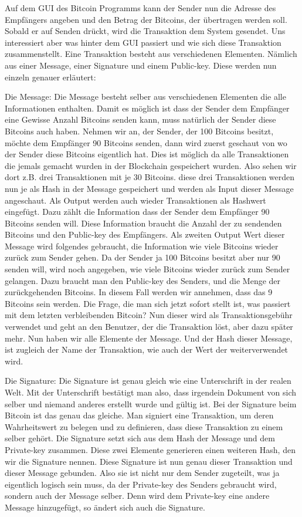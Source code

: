 \noindent
Auf dem GUI des Bitcoin Programms kann der Sender nun die Adresse des Empfängers angeben und den Betrag der Bitcoins, der übertragen werden soll.
Sobald er auf Senden drückt, wird die Transaktion dem System gesendet. Uns interessiert aber was hinter dem GUI passiert und wie sich diese Transaktion zusammenstellt.
Eine Transaktion besteht aus verschiedenen Elementen. Nämlich aus einer Message, einer Signature und einem Public-key. Diese werden nun einzeln genauer erläutert:

\noindent
Die Message:
Die Message besteht selber aus verschiedenen Elementen die alle Informationen enthalten. Damit es möglich ist dass der Sender dem Empfänger eine Gewisse Anzahl Bitcoins senden kann, muss natürlich
der Sender diese Bitcoins auch haben. Nehmen wir an, der Sender, der 100 Bitcoins besitzt, möchte dem Empfänger 90 Bitcoins senden, dann wird zuerst geschaut von wo der Sender diese Bitcoins eigentlich hat. Dies ist möglich da
alle Transaktionen die jemals gemacht wurden in der Blockchain gespeichert wurden. Also sehen wir dort z.B. drei Transaktionen mit je 30 Bitcoins. diese drei Transaktionen werden nun je als Hash in der
Message gespeichert und werden als Input dieser Message angeschaut. Als Output werden auch wieder Transaktionen als Hashwert eingefügt. Dazu zählt die Information dass der Sender dem Empfänger 90 Bitcoins senden
will. Diese Information braucht die Anzahl der zu sendenden Bitcoins und den Public-key des Empfängers. Als zweiten Output Wert dieser Message wird folgendes gebraucht, die Information wie viele Bitcoins wieder
zurück zum Sender gehen. Da der Sender ja 100 Bitcoins besitzt aber nur 90 senden will, wird noch angegeben, wie viele Bitcoins wieder zurück zum Sender gelangen. Dazu braucht man den Public-key des Senders,
und die Menge der zurückgehenden Bitcoins. In diesem Fall werden wir annehmen, dass das 9 Bitcoins sein werden. Die Frage, die man sich jetzt sofort stellt ist, was passiert mit dem letzten verbleibenden
Bitcoin? Nun dieser wird als Transaktionsgebühr verwendet und geht an den Benutzer, der die Transaktion löst, aber dazu später mehr. Nun haben wir alle Elemente der Message. Und der Hash dieser Message, ist
zugleich der Name der Transaktion, wie auch der Wert der weiterverwendet wird.

\noindent
Die Signature:
Die Signature ist genau gleich wie eine Unterschrift in der realen Welt. Mit der Unterschrift bestätigt man also, dass irgendein Dokument von sich selber und niemand anderes erstellt wurde und gültig ist.
Bei der Signature beim Bitcoin ist das genau das gleiche. Man signiert eine Transaktion, um deren Wahrheitswert zu belegen und zu definieren, dass diese Transaktion zu einem selber gehört. Die Signature
setzt sich aus dem Hash der Message und dem Private-key zusammen. Diese zwei Elemente generieren einen weiteren Hash, den wir die Signature nennen. Diese Signature ist nun genau dieser Transaktion
und dieser Message gebunden. Also sie ist nicht nur dem Sender zugeteilt, was ja eigentlich logisch sein muss, da der Private-key des Senders gebraucht wird, sondern auch der Message selber. Denn wird
dem Private-key eine andere Message hinzugefügt, so ändert sich auch die Signature.

